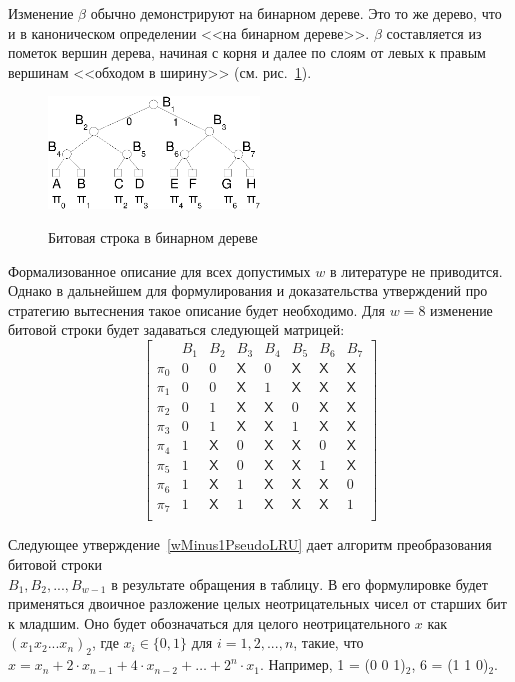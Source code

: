 Изменение $\beta$ обычно демонстрируют на бинарном дереве. Это то же дерево, что и в каноническом определении \PseudoLRU <<на бинарном дереве>>. $\beta$ составляется из пометок вершин дерева, начиная с корня и далее по слоям от левых к правым вершинам <<обходом в ширину>> (см. рис.~\ref{plru_bittree}).

\begin{figure}[h] \center
  \includegraphics[width=0.5\textwidth]{2.theor/plru}\\
  \caption{Битовая строка в бинарном дереве}\label{plru_bittree}
\end{figure}

Формализованное описание для всех допустимых $w$ в литературе не
приводится. Однако в дальнейшем для формулирования и доказательства
утверждений про стратегию вытеснения \PseudoLRU такое описание будет
необходимо. Для $w=8$ изменение битовой строки будет задаваться следующей матрицей:
$$
\left[
  \begin{array}{c|ccccccc}
          & B_1 & B_2 & B_3 & B_4 & B_5 & B_6 & B_7 \\ \hline
    \pi_0 & 0 & 0 & \textsf{X} & 0 & \textsf{X} & \textsf{X} & \textsf{X} \\
    \pi_1 & 0 & 0 & \textsf{X} & 1 & \textsf{X} & \textsf{X} & \textsf{X} \\
    \pi_2 & 0 & 1 & \textsf{X} & \textsf{X} & 0 & \textsf{X} & \textsf{X} \\
    \pi_3 & 0 & 1 & \textsf{X} & \textsf{X} & 1 & \textsf{X} & \textsf{X} \\
    \pi_4 & 1 & \textsf{X} & 0 & \textsf{X} & \textsf{X} & 0 & \textsf{X} \\
    \pi_5 & 1 & \textsf{X} & 0 & \textsf{X} & \textsf{X} & 1 & \textsf{X} \\
    \pi_6 & 1 & \textsf{X} & 1 & \textsf{X} & \textsf{X} & \textsf{X} & 0 \\
    \pi_7 & 1 & \textsf{X} & 1 & \textsf{X} & \textsf{X} & \textsf{X} & 1 \\
  \end{array}
\right]
$$

Следующее утверждение~\ref{wMinus1PseudoLRU} дает алгоритм
преобразования битовой строки\\ $B_1, B_2, ..., B_{w{-}1}$ в результате
обращения в таблицу. В его формулировке будет применяться двоичное
разложение целых неотрицательных чисел от старших бит к младшим. Оно будет обозначаться для целого неотрицательного $x$ как $(x_1 x_2 ... x_n)_2$, где $x_i \in \{0, 1\}$ для $i = 1, 2, ..., n$, такие, что $x = x_n + 2{\cdot}x_{n-1} + 4{\cdot}x_{n-2} + \dots + 2^n{\cdot}x_1$. Например, 1 = (0 0 1)$_2$, 6 = (1 1 0)$_2$.

